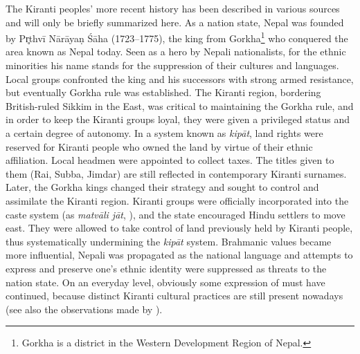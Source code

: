The Kiranti peoples' more recent history has been described in various sources  \citep{Caplan1970_Land, Pradhan1991The-Gorkha, Gaenszle2002_Remaking, Schlemmer2003_New, Whelpton2005A-History} and will  only be briefly summarized here. As a nation state, Nepal was founded by Pr̥thvī Nārāyaṇ Śāha (1723--1775), the king from Gorkha\footnote{Gorkha is a district in the Western Development Region of Nepal.} who conquered the area known as Nepal today. Seen as a hero by Nepali nationalists, for the ethnic minorities his name stands for the suppression of their cultures and languages. Local groups confronted the king and his successors with strong armed resistance, but eventually Gorkha rule was established. The Kiranti region, bordering British-ruled Sikkim in the East, was critical to maintaining the Gorkha rule, and in order to keep the Kiranti groups loyal, they were given a privileged status and a certain degree of autonomy. In a system known as \emph{kipāt}, land rights were reserved for Kiranti people who owned the land by virtue of their ethnic affiliation. Local headmen were appointed to collect taxes. The titles given to them (Rai, Subba, Jimdar) are still reflected in contemporary Kiranti surnames. Later, the Gorkha kings changed their strategy and sought to control and assimilate the Kiranti region. Kiranti groups were officially incorporated into the caste system (as \emph{matvāli jāt}, ), and the state encouraged Hindu settlers to move east. They were allowed to take control of land previously held by Kiranti people, thus systematically undermining the \emph{kipāt} system. Brahmanic values became more influential, Nepali was propagated as the national language and attempts to express and preserve one's ethnic identity were suppressed as threats to the nation state. On an everyday level,  obviously some expression of  must have continued, because distinct Kiranti cultural practices are still present nowadays (see also the observations made by \citealt{Russell2004Traditions}).
 
